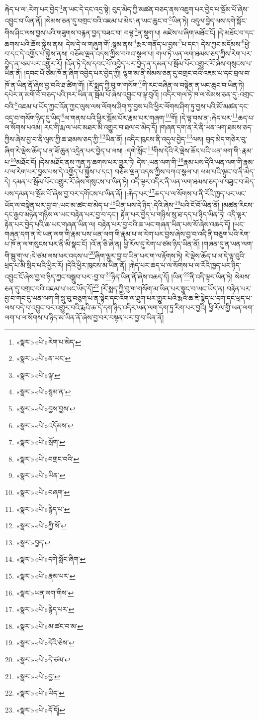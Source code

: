 རྐེད་པ་ལ་:རེག་པར་བྱེད་\footnote{«སྣར་»«པེ་»རེག་པ་མེད་}ན་ཡང་དེ་དང་འདྲ་སྟེ། བུད་མེད་ཀྱི་མཚན་བཅད་ནས་འཇུག་པར་བྱེད་པ་སྦོམ་པོ་ཞེས་འབྱུང་བ་ཡིན་ནོ། །སེམས་ཅན་དུ་བགྲང་བའི་འཇམ་པ་མེད་:ན་ཡང་ཆུང་བ་\footnote{«སྣར་»«པེ་»ན་ཡང་}ཡིན་ཏེ། འདུལ་བྱེད་ལས་དགེ་སློང་གིས་ཤིང་ལས་བྱས་པའི་གཟུགས་བརྙན་བྱད་བཟང་བ། བལྟ་\footnote{«སྣར་»«པེ་»ལྟ་}ན་སྡུག་པ། མཛེས་པ་ཞིག་མཐོང་ངོ། །དེ་མཐོང་བ་དང་ཆགས་པའི་ཆོས་སྐྱེས་ནས། དེས་དེ་ལ་གཞུག་གོ་:སྙམ་ནས་\footnote{«སྣར་»«པེ་»སྙམ་ན་}རྨར་གནོད་པ་བྱས་\footnote{«སྣར་»«པེ་»བྱས་བྱས་}པ་དང་། དེས་ཀྱང་མདོམས་\footnote{«སྣར་»«པེ་»འདོམས་}ཕྱེ་བ་དང་དེ་འགྱོད་པ་སྐྱེས་ནས། བཅོམ་ལྡན་འདས་ཀྱིས་བཀའ་སྩལ་པ། གལ་ཏེ་ཡན་ལག་ཐམས་ཅད་ཀྱིས་རེག་པར་བྱེད་ན་ཕམ་པར་འགྱུར་རོ། །འོན་ཏེ་དེས་དབང་པོ་འབྱེད་པར་བྱེད་ན་དམན་པ་སྦོམ་པོར་འགྱུར་རོ་ཞེས་གསུངས་པ་ཡིན་ནོ། །དབང་པོ་ཙམ་ཁོ་ན་ཞིག་འབྱེད་པར་བྱེད་ཀྱི། ལྷག་མ་ནི་སེམས་ཅན་དུ་བགྲང་བའི་འཇམ་པ་དང་བྲལ་བ་ཁོ་ན་ཡིན་ནོ་ཞེས་བྱ་བའི་ཐ་ཚིག་གོ། །རོ་སྨད་ཀྱི་བུ་ག་གསོག་\footnote{«སྣར་»«པེ་»སྲོག་}གི་རང་བཞིན་ལ་བསྟེན་ན་ཡང་ཆུང་བ་ཡིན་ཏེ། དཔེར་ན་མགོ་བོ་བཅད་པའི་ཁར་ཡིན་ན་སྦོམ་པོ་ཞེས་འབྱུང་བ་ལྟ་བུའོ། །འདིར་གལ་ཏེ་ཁ་ལ་སེམས་ཅན་དུ་:འགྲང་བའི་\footnote{«སྣར་»«པེ་»བགྲང་བའི་}འཇམ་པ་ཡོད་ཀྱང་འོན་ཀྱང་ལུས་ལས་ལོགས་ཤིག་ཏུ་བྱས་པའི་ཕྱིར་ལོགས་ཤིག་ཏུ་བྱས་པའི་མོ་མཚན་དང་འདྲ་བ་གསོག་ཉིད་དུ་ཡིད་\footnote{«སྣར་»«པེ་»ཡིན་}ལ་གནས་པའི་ཕྱིར་སྦོམ་པོར་རྣམ་པར་གཞག་\footnote{«སྣར་»«པེ་»བཞག་}གོ། །དེ་ལྟ་བས་ན་:རྐེད་པར་\footnote{«སྣར་»«པེ་»རྙེད་པ་}ཆད་པ་ལ་སོགས་པའམ། རང་གི་རྨ་ལ་ཡང་མཐར་མི་འགྱུར་བ་ཐལ་བ་མེད་དོ། །གཞན་དག་ན་རེ་ནི་ཡན་ལག་ཐམས་ཅད་ཀྱིས་ཞེས་བྱ་བ་ནི་ལུས་ཀྱི་ཆ་ཐམས་ཅད་ཀྱི་\footnote{«སྣར་»«པེ་»ཀྱི་སོ་}ཡིན་ནོ། །འདིར་ཁུངས་ནི་འདུལ་བྱེད་\footnote{«སྣར་»བྱད་}ལས། བུད་མེད་གཅེར་བུ་ཞིག་རེ་ལྡེས་ཆོད་པ་ན་ཟོ་ཆུན་འདྲེན་པར་བྱེད་པ་ལས། :དགེ་སློང་\footnote{«སྣར་»«པེ་»དགེ་སློང་ཞིག་}གིས་དེའི་རེ་ལྡེས་ཆོད་པའི་ཡན་ལག་གི་:རྣམ་པ་\footnote{«སྣར་»«པེ་»རྣམ་པར་}མཐོང་ངོ། །དེས་མཐོང་ནས་ཀུན་ཏུ་ཆགས་པར་གྱུར་ཏེ། དེས་:ཡན་ལག་གི་\footnote{«སྣར་»ཡན་ལག་གིས་}རྣམ་པས་དེའི་ཡན་ལག་གི་རྣམ་པ་ལ་རེག་པར་བྱས་པས་དེ་འགྱོད་པ་སྐྱེས་པ་དང་། བཅོམ་ལྡན་འདས་ཀྱིས་བཀའ་སྩལ་པ། ཕམ་པའི་ལྟུང་བ་ནི་མེད་དེ། དམན་པ་སྦོམ་པོར་འགྱུར་རོ་ཞེས་གསུངས་པ་ཡིན་ཏེ། འདི་ལྟར་འདིར་ནི་ཡན་ལག་ཐམས་ཅད་ལ་བཟུང་བ་མེད་པས་དམན་པ་སྦོམ་པོ་ཞེས་བྱ་བར་དགོངས་པ་ཡིན་ནོ། །:རྐེད་པར་\footnote{«སྣར་»«པེ་»རྙེད་པར་}ཆད་པ་ལ་སོགས་པ་ནི་རོའི་ཁྱད་པར་ཡང་ཡོད་ལ་བསྟེན་པར་བྱ་བ་:ཡང་མ་ཚང་བ་མེད་པ་\footnote{«སྣར་»«པེ་»མ་ཚང་བ་མ་}ཡིན་པས་དེ་ཉིད་:དེའི་ཞེས་\footnote{«སྣར་»«པེ་»དེའི་ཅེས་}པའི་ངོ་བོ་ཡིན་ནོ། །མཚན་རིངས་དང་རྒྱབ་མཉེན་གཉིས་ལ་ཡང་བརྟེན་པར་བྱ་བ་དང་། རྟེན་པར་བྱེད་པ་གཉིས་སུ་ཐ་དད་པ་ཉིད་ཡིན་ཏེ། འདི་ལྟར་རྟེན་པར་བྱེད་པའི་ཆ་ཡང་གཞན་ཡིན་ལ། བརྟེན་པར་བྱ་བའི་ཆ་ཡང་གཞན་ཡིན་པས་སོ་ཞེས་འཆད་དོ། །ཡང་གཞན་དག་ན་རེ་ཡན་ལག་གི་རྣམ་པས་ཡན་ལག་གི་རྣམ་པ་ལ་རེག་པར་བྱས་ཞེས་བྱ་བ་འདི་ནི་བཅུག་པའི་རེག་པ་ཁོ་ན་ལ་གསུངས་པར་ནི་མི་སྣང་ངོ། །འོ་ན་ཅི་ཞེ་ན། ཕྱི་རོལ་དུ་རེག་པ་ཙམ་ཉིད་ཡིན་ནོ། །གཞན་དུ་ན་ཡན་ལག་གི་སྦུ་གུ་ལ་:དེ་ཙམ་ལས་ཕར་འདས་པ་\footnote{«སྣར་»«པེ་»དེ་ཙམ་}ཞིག་ལྷུར་བྱ་བ་ཡིན་པར་ག་ལ་རྟོགས་ཏེ། རེ་ལྡེས་ཆོད་པ་ལ་དེ་ལྟ་བུའི་ཕྲད་པ་མི་སྲིད་པའི་ཕྱིར་རོ། །དེའི་ཕྱིར་ཁུངས་མ་ཡིན་ནོ། །རྐེད་པར་ཆད་པ་ལ་སོགས་པ་ལ་རོའི་ཁྱད་པར་ཉིད་འབྱུང་ངོ་ཞེས་བྱ་བ་ཉིད་ཀྱང་བསྒྲུབ་པར་:བྱ་བ་\footnote{«སྣར་»«པེ་»བྱ་}ཉིད་ཡིན་ནོ་ཞེས་འཆད་དོ། །ཡིན་\footnote{«སྣར་»«པེ་»ཡིད་}ནི་འདི་ལྟར་ཡིན་ཏེ། སེམས་ཅན་དུ་བགྲང་བའི་འཇམ་པ་ཡང་ཡོད་དོ།\footnote{«སྣར་»«པེ་»དོ་དོ།} །རོ་སྨད་ཀྱི་བུ་ག་གསོག་མ་ཡིན་པར་སྣང་བ་ཡང་ཡོད་ན། བརྟེན་པར་བྱ་བ་གང་དུ་ཡན་ལག་གི་སྦུ་བུ་བཅུག་པ་ན་སྟེང་དང་འོག་ལ་ཐུག་པར་གྱུར་པའི་རྨའི་ཆ་ཇི་སྙེད་པ་དག་དང་ཕྲད་པ་ལས་བདེ་བ་འབྱུང་བར་འགྱུར་བའི་རྨའི་ཆ་དེ་དག་ཉིད་འདིར་ཡན་ལག་དག་ཏུ་རིག་པར་བྱའི། ཕྱི་རོལ་གྱི་ཡན་ལག་ལག་པ་ལ་སོགས་པ་ཉིད་མ་ཡིན་ནོ་ཞེས་བྱ་བར་བསྟན་པར་བྱ་བ་ཡིན་ནོ། 